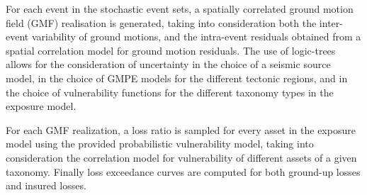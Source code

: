 For each event in the stochastic event sets, a spatially correlated ground motion field (GMF) realisation is generated, taking into consideration both the inter-event variability of ground motions, and the intra-event residuals obtained from a spatial correlation model for ground motion residuals. The use of logic-trees allows for the consideration of uncertainty in the choice of a seismic source model, in the choice of GMPE models for the different tectonic regions, and in the choice of vulnerability functions for the different taxonomy types in the exposure model.

For each GMF realization, a loss ratio is sampled for every asset in the exposure model using the provided probabilistic vulnerability model, taking into consideration the correlation model for vulnerability of different assets of a given taxonomy. Finally loss exceedance curves are computed for both ground-up losses and insured losses.